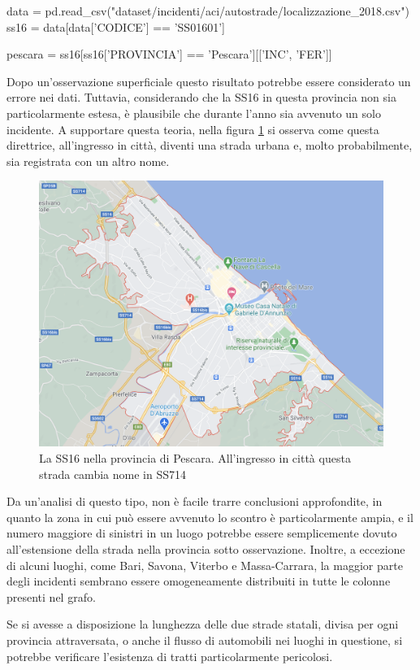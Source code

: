 \documentclass[a4paper,12pt]{report}
\begin{document}
\begin{code}
data = pd.read_csv("dataset/incidenti/aci/autostrade/localizzazione_2018.csv")
ss16 = data[data['CODICE'] == 'SS01601']

pescara = ss16[ss16['PROVINCIA'] == 'Pescara'][['INC', 'FER']]
\end{code}

Dopo un'osservazione superficiale questo risultato potrebbe 
essere considerato un errore nei dati. 
Tuttavia, considerando che la SS16 in questa provincia non 
sia particolarmente estesa, è plausibile che durante l'anno sia avvenuto un solo incidente. 
A supportare questa teoria, nella figura \ref{fig:ss16-pescara} si osserva come 
questa direttrice, all'ingresso in città, diventi una strada urbana e, molto probabilmente, 
sia registrata con un altro nome. 

\begin{figure}
    \hfill\includegraphics[width=0.7\linewidth]{img/pescara_ss16.png}\hspace*{\fill}
    \caption{La SS16 nella provincia di Pescara. All'ingresso in città questa strada cambia nome in SS714}
    \label{fig:ss16-pescara}
\end{figure}

Da un'analisi di questo tipo, non è facile trarre conclusioni approfondite, in quanto la 
zona in cui può essere avvenuto lo scontro è particolarmente ampia, 
e il numero maggiore di sinistri in un luogo potrebbe essere semplicemente 
dovuto all'estensione della strada nella provincia sotto osservazione. 
Inoltre, a eccezione di alcuni luoghi, come Bari, Savona, Viterbo e Massa-Carrara, 
la maggior parte degli incidenti sembrano essere omogeneamente distribuiti 
in tutte le colonne presenti nel grafo. 

Se si avesse a disposizione la lunghezza delle due strade statali, 
divisa per ogni provincia attraversata,
o anche il flusso di automobili nei luoghi in questione, 
si potrebbe verificare l'esistenza di tratti particolarmente pericolosi. 
\end{document}
